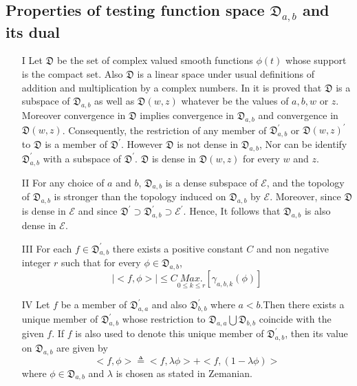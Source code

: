 \subsection{Properties of testing function space $\mathfrak{D}_{a,b}$ and its dual}
\begin{itemize}
\item[I]Let $\mathfrak{D}$ be the set of complex valued smooth functions $ \phi(t) $ whose support is the compact set. Also $\mathfrak{D}$ is a linear space under usual definitions of addition and multiplication by a complex numbers. In \cite{R98} it is proved that $\mathfrak{D}$ is a subspace of $\mathfrak{D}_{a,b}$ as well as $\mathfrak{D}(w,z)$ whatever be the values of $ a, b, w $ or $z $. Moreover convergence in $\mathfrak{D}$ implies convergence in $\mathfrak{D}_{a,b}$ and convergence in $\mathfrak{D}(w,z)$. Consequently, the restriction of any member of $\mathfrak{D}_{a,b}^{'}$ or $\mathfrak{D}(w,z)^{'}$ to $\mathfrak{D}$ is a member of $\mathfrak{D}^{'}$. However $\mathfrak{D}$ is not dense in $\mathfrak{D}_{a,b}$, Nor can be identify $\mathfrak{D}_{a,b}^{'}$ with a subspace of $\mathfrak{D}^{'}$. $\mathfrak{D}$ is dense in $\mathfrak{D}(w,z)$ for every $w$ and $z$\cite{R98}.

\item[II]For any choice of $a$ and $b$, $\mathfrak{D}_{a,b}$ is a dense subspace of $\mathcal{E}$, and the topology of $\mathfrak{D}_{a,b}$ is stronger than the topology induced on $\mathfrak{D}_{a,b}$ by $ \mathcal{E} $. Moreover, since $\mathfrak{D}$  is dense in $\mathcal{E} $ and since  $\mathfrak{D}^{'}\supset \mathfrak{D}_{a,b}^{'} \supset \mathcal{E}^{'} $. Hence, It follows that $\mathfrak{D}_{a,b}$ is also dense in $\mathcal{E} $\cite{R98}.

\item[III]For each $ f \in \mathfrak{D}_{a,b}^{'} $ there exists a positive constant $C$ and non negative integer $r$ such that for every $\phi \in  \mathfrak{D}_{a,b} $\cite{R98},
\begin{equation}
\vert <f,\phi> \vert \leq C \underset{0\leq k\leq r}{Max.}[\gamma_{a,b,k}(\phi)]
\end{equation}
\item[IV] Let $f$ be a member of $ \mathfrak{D}_{a,a}^{'} $ and also $ \mathfrak{D}_{b,b}^{'} $ where $ a < b $.Then there exists a unique member of $ \mathfrak{D}_{a,b}^{'} $ whose restriction to $ \mathfrak{D}_{a,a}\bigcup \mathfrak{D}_{b,b}$ coincide with the given $f$. If $f$ is also used to denote this unique member of $ \mathfrak{D}_{a,b}^{'} $, then its
value on $ \mathfrak{D}_{a,b}$ are given by
\begin{equation*}
<f,\phi>\triangleq  <f,\lambda\phi>+<f,(1-\lambda\phi)>
\end{equation*}
where $ \phi\in \mathfrak{D}_{a,b} $ and $  \lambda$ is chosen as stated in Zemanian\cite{R98}.


\end{itemize}
